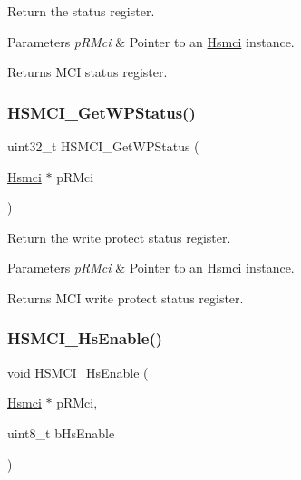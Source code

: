 Return the status register. 


\begin{DoxyParams}{Parameters}
{\em p\+R\+Mci} & Pointer to an \mbox{\hyperlink{structHsmci}{Hsmci}} instance. \\
\hline
\end{DoxyParams}
\begin{DoxyReturn}{Returns}
M\+CI status register. 
\end{DoxyReturn}
\mbox{\label{group__hsmci__functions_ga98efe2806580596d2bc2236b52f0b7ee}} 
\subsubsection{\texorpdfstring{HSMCI\_GetWPStatus()}{HSMCI\_GetWPStatus()}}
{\footnotesize\ttfamily uint32\+\_\+t H\+S\+M\+C\+I\+\_\+\+Get\+W\+P\+Status (\begin{DoxyParamCaption}\item[{\mbox{\hyperlink{structHsmci}{Hsmci}} $\ast$}]{p\+R\+Mci }\end{DoxyParamCaption})}



Return the write protect status register. 


\begin{DoxyParams}{Parameters}
{\em p\+R\+Mci} & Pointer to an \mbox{\hyperlink{structHsmci}{Hsmci}} instance. \\
\hline
\end{DoxyParams}
\begin{DoxyReturn}{Returns}
M\+CI write protect status register. 
\end{DoxyReturn}
\mbox{\label{group__hsmci__functions_ga9365f2817b47644f8c0f325a915fb141}} 
\subsubsection{\texorpdfstring{HSMCI\_HsEnable()}{HSMCI\_HsEnable()}}
{\footnotesize\ttfamily void H\+S\+M\+C\+I\+\_\+\+Hs\+Enable (\begin{DoxyParamCaption}\item[{\mbox{\hyperlink{structHsmci}{Hsmci}} $\ast$}]{p\+R\+Mci,  }\item[{uint8\+\_\+t}]{b\+Hs\+Enable }\end{DoxyParamCaption})}



